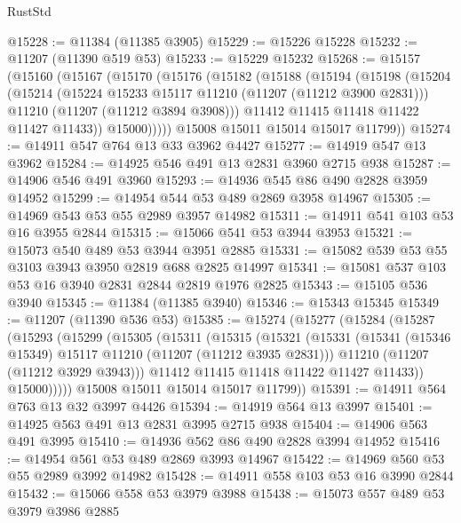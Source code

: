 \begin{lexlean}{RustStd}
\begin{coremodule}
@15228 := @11384 (@11385 @3905)
@15229 := @15226 @15228
@15232 := @11207 (@11390 @519 @53)
@15233 := @15229 @15232
@15268 := @15157
    (@15160
      (@15167
        (@15170
          (@15176
            (@15182
              (@15188
                (@15194
                  (@15198
                    (@15204
                      (@15214
                        (@15224 @15233 @15117 @11210 (@11207 (@11212 @3900 @2831)))
                        @11210
                        (@11207 (@11212 @3894 @3908)))
                      @11412
                      @11415
                      @11418
                      @11422
                      @11427
                      @11433))
                  @15000)))))
        @15008
        @15011
        @15014
        @15017
        @11799))
@15274 := @14911 @547 @764 @13 @33 @3962 @4427
@15277 := @14919 @547 @13 @3962
@15284 := @14925 @546 @491 @13 @2831 @3960 @2715 @938
@15287 := @14906 @546 @491 @3960
@15293 := @14936 @545 @86 @490 @2828 @3959 @14952
@15299 := @14954 @544 @53 @489 @2869 @3958 @14967
@15305 := @14969 @543 @53 @55 @2989 @3957 @14982
@15311 := @14911 @541 @103 @53 @16 @3955 @2844
@15315 := @15066 @541 @53 @3944 @3953
@15321 := @15073 @540 @489 @53 @3944 @3951 @2885
@15331 := @15082 @539 @53 @55 @3103 @3943 @3950 @2819 @688 @2825 @14997
@15341 := @15081 @537 @103 @53 @16 @3940 @2831 @2844 @2819 @1976 @2825
@15343 := @15105 @536 @3940
@15345 := @11384 (@11385 @3940)
@15346 := @15343 @15345
@15349 := @11207 (@11390 @536 @53)
@15385 := @15274
    (@15277
      (@15284
        (@15287
          (@15293
            (@15299
              (@15305
                (@15311
                  (@15315
                    (@15321
                      (@15331
                        (@15341 (@15346 @15349) @15117 @11210 (@11207 (@11212 @3935 @2831)))
                        @11210
                        (@11207 (@11212 @3929 @3943)))
                      @11412
                      @11415
                      @11418
                      @11422
                      @11427
                      @11433))
                  @15000)))))
        @15008
        @15011
        @15014
        @15017
        @11799))
@15391 := @14911 @564 @763 @13 @32 @3997 @4426
@15394 := @14919 @564 @13 @3997
@15401 := @14925 @563 @491 @13 @2831 @3995 @2715 @938
@15404 := @14906 @563 @491 @3995
@15410 := @14936 @562 @86 @490 @2828 @3994 @14952
@15416 := @14954 @561 @53 @489 @2869 @3993 @14967
@15422 := @14969 @560 @53 @55 @2989 @3992 @14982
@15428 := @14911 @558 @103 @53 @16 @3990 @2844
@15432 := @15066 @558 @53 @3979 @3988
@15438 := @15073 @557 @489 @53 @3979 @3986 @2885

\end{coremodule}
\end{lexlean}

